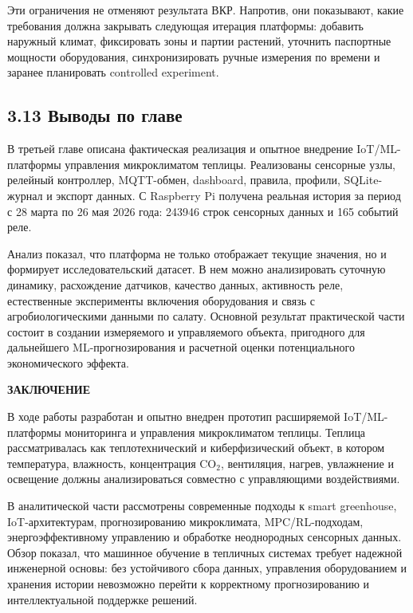 \documentclass[a4paper,14pt]{extarticle}
\newcommand{\VkrStructuralSection}[1]{%
  \FloatBarrier
  \clearpage
  \phantomsection
  \addcontentsline{toc}{section}{#1}%
  \begin{center}\bfseries #1\end{center}%
  \par\nopagebreak\vspace{12pt}%
}
\begin{document}
Эти ограничения не отменяют результата ВКР. Напротив, они показывают,
какие требования должна закрывать следующая итерация платформы: добавить
наружный климат, фиксировать зоны и партии растений, уточнить паспортные
мощности оборудования, синхронизировать ручные измерения по времени и
заранее планировать controlled experiment.

\subsection{3.13 Выводы по
главе}\label{ux432ux44bux432ux43eux434ux44b-ux43fux43e-ux433ux43bux430ux432ux435-1}

В третьей главе описана фактическая реализация и опытное внедрение
IoT/ML-платформы управления микроклиматом теплицы. Реализованы сенсорные
узлы, релейный контроллер, MQTT-обмен, dashboard, правила, профили,
SQLite-журнал и экспорт данных. С Raspberry Pi получена реальная история
за период с 28 марта по 26 мая 2026 года: 243946 строк сенсорных данных
и 165 событий реле.

Анализ показал, что платформа не только отображает текущие значения, но
и формирует исследовательский датасет. В нем можно анализировать
суточную динамику, расхождение датчиков, качество данных, активность
реле, естественные эксперименты включения оборудования и связь с
агробиологическими данными по салату. Основной результат практической
части состоит в создании измеряемого и управляемого объекта, пригодного
для дальнейшего ML-прогнозирования и расчетной оценки потенциального
экономического эффекта.

\VkrStructuralSection{ЗАКЛЮЧЕНИЕ}\label{ux437ux430ux43aux43bux44eux447ux435ux43dux438ux435}

В ходе работы разработан и опытно внедрен прототип расширяемой
IoT/ML-платформы мониторинга и управления микроклиматом теплицы. Теплица
рассматривалась как теплотехнический и киберфизический объект, в котором
температура, влажность, концентрация CO\(_2\), вентиляция, нагрев,
увлажнение и освещение должны анализироваться совместно с управляющими
воздействиями.

В аналитической части рассмотрены современные подходы к smart
greenhouse, IoT-архитектурам, прогнозированию микроклимата,
MPC/RL-подходам, энергоэффективному управлению и обработке неоднородных
сенсорных данных. Обзор показал, что машинное обучение в тепличных
системах требует надежной инженерной основы: без устойчивого сбора
данных, управления оборудованием и хранения истории невозможно перейти к
корректному прогнозированию и интеллектуальной поддержке решений.
\end{document}
